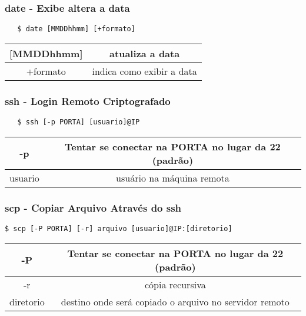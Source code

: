 \documentclass{beamer}
\begin{document}
\begin{frame}[fragile]
   \frametitle{date - Exibe altera a data}
   \begin{verbatim}
   $ date [MMDDhhmm] [+formato]
   \end{verbatim}
   \begin{table}
      \begin{tabular}{ c | c }
         [MMDDhhmm] & atualiza a data \\
         \hline 
         +formato & indica como exibir a data \\ 
      \end{tabular}
   \end{table}
\end{frame}

\begin{frame}[fragile]
   \frametitle{ssh - Login Remoto Criptografado}
   \begin{verbatim}
   $ ssh [-p PORTA] [usuario]@IP
   \end{verbatim}
   \begin{table}
      \begin{tabular}{ c | c }
         -p & Tentar se conectar na PORTA no lugar da 22 (padrão) \\
         \hline 
         usuario & usuário na máquina remota \\ 
      \end{tabular}
   \end{table}
\end{frame}

\begin{frame}[fragile]
   \frametitle{scp - Copiar Arquivo Através do ssh}
   \begin{verbatim}
$ scp [-P PORTA] [-r] arquivo [usuario]@IP:[diretorio]
   \end{verbatim}
   \begin{table}
      \begin{tabular}{ c | c }
         -P & Tentar se conectar na PORTA no lugar da 22 (padrão) \\
         \hline 
         -r & cópia recursiva \\ 
         \hline
         diretorio & destino onde será copiado o arquivo no servidor remoto \\ 
      \end{tabular}
   \end{table}
\end{frame}
\end{document}
